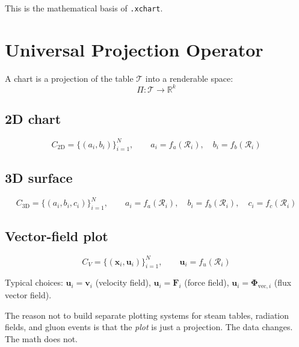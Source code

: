 \documentclass[11pt, a4paper, oneside]{article}
\newcommand{\Rec}{\mathcal{R}}           %
\newcommand{\Tab}{\mathcal{T}}           %
\newcommand{\Proj}{\Pi}                  %
\newcommand{\xvec}{\mathbf{x}}
\newcommand{\vvec}{\mathbf{v}}
\newcommand{\Fvec}{\mathbf{F}}
\newcommand{\Phivec}{\bm{\Phi}}
\newcommand{\uvec}{\mathbf{u}}
\begin{document}
This is the mathematical basis of \texttt{.xchart}.

\section{Universal Projection Operator}
\label{sec:projection}

A chart is a projection of the table $\Tab$ into a renderable space:
\begin{equation}
  \Proj : \Tab \to \mathbb{R}^k
  \label{eq:proj}
\end{equation}

\subsection{2D chart}

\begin{equation}
  C_{\mathrm{2D}} = \bigl\{(a_i, b_i)\bigr\}_{i=1}^{N},
  \qquad
  a_i = f_a(\Rec_i),\quad b_i = f_b(\Rec_i)
  \label{eq:proj2d}
\end{equation}

\subsection{3D surface}

\begin{equation}
  C_{\mathrm{3D}} = \bigl\{(a_i, b_i, c_i)\bigr\}_{i=1}^{N},
  \qquad
  a_i = f_a(\Rec_i),\quad b_i = f_b(\Rec_i),\quad c_i = f_c(\Rec_i)
  \label{eq:proj3d}
\end{equation}

\subsection{Vector-field plot}

\begin{equation}
  C_V = \bigl\{(\xvec_i, \uvec_i)\bigr\}_{i=1}^{N},
  \qquad
  \uvec_i = f_u(\Rec_i)
  \label{eq:projvec}
\end{equation}

Typical choices: $\uvec_i = \vvec_i$ (velocity field), $\uvec_i = \Fvec_i$
(force field), $\uvec_i = \Phivec_{\mathrm{vec},i}$ (flux vector field).

\medskip
\noindent The reason not to build separate plotting systems for steam tables,
radiation fields, and gluon events is that the \emph{plot} is just a
projection. The data changes. The math does not.
\end{document}
